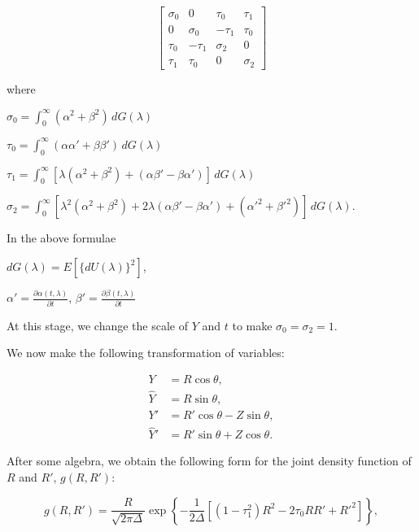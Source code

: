 \documentclass{article}
\begin{document}
\begin{equation}
\label{eq:covariance_matrix}
\begin{bmatrix} 
\sigma_0 & 0 & \tau_0 & \tau_1 \\
0 & \sigma_0 & -\tau_1 & \tau_0 \\
\tau_0 & -\tau_1 & \sigma_2 & 0 \\
\tau_1 & \tau_0 & 0 & \sigma_2
\end{bmatrix}
\end{equation}

where

$\sigma_0 = \int_0^{\infty} (\alpha^2+ \beta^2) \, dG(\lambda)$

$\tau_0 = \int_0^{\infty} (\alpha\alpha' + \beta\beta') \, dG(\lambda)$

$\tau_1= \int_0^{\infty} [\lambda(\alpha^2+\beta^2)+(\alpha\beta' - \beta\alpha')] \, dG(\lambda)$

$\sigma_2 = \int_0^{\infty} [\lambda^2(\alpha^2 + \beta^2) + 2\lambda (\alpha\beta' - \beta\alpha') + (\alpha'^2 + \beta'^2)] \, dG(\lambda)$.

In the above formulae

$dG(\lambda) = E[\{dU(\lambda)\}^2]$,

$\alpha' = \frac{\partial \alpha(t, \lambda)}{\partial t}$, $\beta' = \frac{\partial \beta(t, \lambda)}{\partial t}$

At this stage, we change the scale of $Y$ and $t$ to make $\sigma_0= \sigma_2 = 1$.

We now make the following transformation of variables:

\begin{equation}
\begin{aligned}
Y &= R \cos \theta, \\
\hat{Y} &= R \sin \theta, \\
Y' &= R' \cos \theta - Z \sin \theta, \\
\hat{Y}' &= R' \sin \theta + Z \cos \theta.
\end{aligned}
\label{eq:transformation}
\end{equation}

After some algebra, we obtain the following form for the joint density function of $R$ and $R'$, $g(R, R')$:

\begin{equation}
\label{eq:joint_density}
g(R, R') = \frac{R}{\sqrt{2\pi\Delta}} \exp\left\{-\frac{1}{2\Delta}[(1-\tau_1^2)R^2-2\tau_0RR' + R'^2]\right\},
\end{equation}
\end{document}
